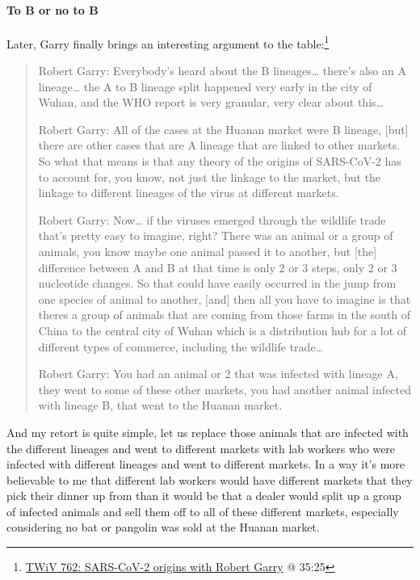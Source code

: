 \documentclass[11pt]{article}
\begin{document}
\paragraph{To B or no to B}
\label{sec:orgc12fe8f}
Later, Garry finally brings an interesting argument to the table:\footnote{\href{https://youtu.be/IxwrDSYrhjU?t=2125}{TWiV 762: SARS-CoV-2 origins with Robert Garry} @ 35:25}
\begin{quote}
Robert Garry: Everybody's heard about the B lineages\ldots{} there's also an A lineage\ldots{} the A to B lineage split happened very early in the city of Wuhan, and the WHO report is very granular, very clear about this\ldots{}

Robert Garry: All of the cases at the Huanan market were B lineage, [but] there are other cases that are A lineage that are linked to other markets. So what that means is that any theory of the origins of SARS-CoV-2 has to account for, you know, not just the linkage to the market, but the linkage to different lineages of the virus at different markets.

Robert Garry: Now\ldots{} if the viruses emerged through the wildlife trade that's pretty easy to imagine, right? There was an animal or a group of animals, you know maybe one animal passed it to another, but [the] difference between A and B at that time is only 2 or 3 steps, only 2 or 3 nucleotide changes. So that could have easily occurred in the jump from one species of animal to another, [and] then all you have to imagine is that theres a group of animals that are coming from those farms in the south of China to the central city of Wuhan which is a distribution hub for a lot of different types of commerce, including the wildlife trade\ldots{}

Robert Garry: You had an animal or 2 that was infected with lineage A, they went to some of these other markets, you had another animal infected with lineage B, that went to the Huanan market.
\end{quote}
And my retort is quite simple, let us replace those animals that are infected with the different lineages and went to different markets with lab workers who were infected with different lineages and went to different markets. In a way it's more believable to me that different lab workers would have different markets that they pick their dinner up from than it would be that a dealer would split up a group of infected animals and sell them off to all of these different markets, especially considering no bat or pangolin was sold at the Huanan market.
\end{document}
